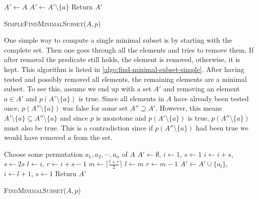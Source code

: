 \begin{algorithm}[ht]
  \begin{algorithmic}
    \State $A' \gets A$
        \State $A' \gets A' \setminus \{ a \}$
      \EndIf
    \EndFor
    \State Return $A'$
  \end{algorithmic}
  \caption{\textsc{SimpleFindMinimalSubset}($A, p$)}
  \label{algo:find-minimal-subset-simple}
\end{algorithm}

One simple way to compute a single minimal subset is by starting with the complete set. Then one goes through all the elements and tries to remove them. If after removal the predicate still holds, the element is removed, otherwise, it is kept. This algorithm is listed in \cref{algo:find-minimal-subset-simple}. After having tested and possibly removed all elements, the remaining elements are a minimal subset. To see this, assume we end up with a set $A'$ and removing an element $a \in A'$ and $p(A' \setminus \{ a \})$ is true. Since all elements in $A$ have already been tested once, $p(A'' \setminus \{ a \})$ was false for some set $A'' \supseteq A'$. However, this means $A' \setminus \{ a \} \subseteq A'' \setminus \{ a \}$ and since $p$ is monotone and $p(A' \setminus \{ a \})$ is true, $p(A'' \setminus \{ a \})$ must also be true. This is a contradiction since if $p(A'' \setminus \{ a \})$ had been true we would have removed $a$ from the set.

\begin{algorithm}[ht]
  \begin{algorithmic}
    \State Choose some permutation $a_1, a_2, \cdots, a_n$ of $A$
    \State $A' \gets \emptyset$, \enspace $i \gets 1$, \enspace $s \gets 1$
        \State $i \gets i + s$, \enspace $s \gets 2 s$
      \Else
        \State $l \gets i$, \enspace $r \gets i + s - 1$
          \State $m \gets \lceil \frac{l + r}{2} \rceil$
            \State $l \gets m$
          \Else
            \State $r \gets m - 1$
          \EndIf
        \EndWhile
        \State $A' \gets A' \cup \{ a_l \}$, \enspace $i \gets l + 1$, \enspace $s \gets 1$
      \EndIf
    \EndWhile
    \State Return $A'$
  \end{algorithmic}
  \caption{\textsc{FindMinimalSubset}($A, p$)}
  \label{algo:find-minimal-subset}
\end{algorithm}

